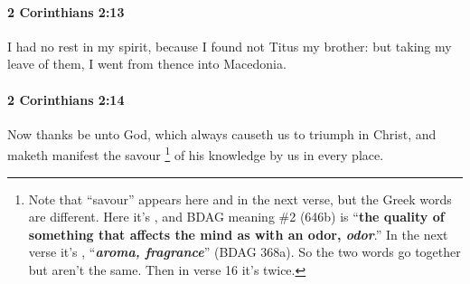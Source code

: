 		\paragraph{2 Corinthians 2:13} %
			\label{2CORINTHIANS-2-13}

			I had no rest in my spirit, because I found not Titus my brother: but taking my leave of them, I went from thence into Macedonia.

			\begin{framed}
			\scriptsize
				\begin{compactdesc}
					\item[SBLG] 
				\end{compactdesc}
			\end{framed}

		\paragraph{2 Corinthians 2:14} %
			\label{2CORINTHIANS-2-14}

			Now thanks be unto God, which always causeth us to triumph in Christ, and maketh manifest the savour%
				\footnote{%
					Note that ``savour'' appears here and in the next verse, but the Greek words are different. Here it's , and BDAG meaning \#2 (646b) is ``\textbf{the quality of something that affects the mind as with an odor, \textit{odor}}.'' In the next verse it's , ``\textbf{\textit{aroma, fragrance}}'' (BDAG 368a). So the two words go together but aren't the same. Then in verse 16 it's  twice.
					}
			of his knowledge by us in every place.

